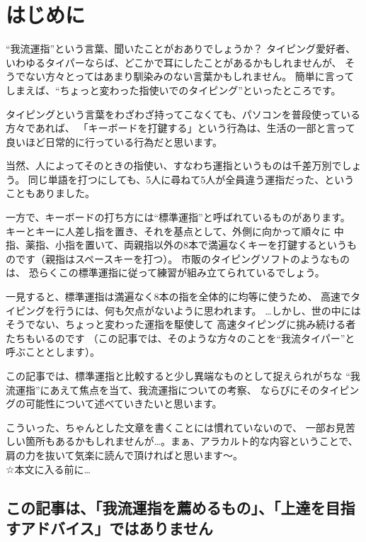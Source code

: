 
\section{はじめに}

“我流運指”という言葉、聞いたことがおありでしょうか？
タイピング愛好者、いわゆるタイパーならば、どこかで耳にしたことがあるかもしれませんが、
そうでない方々とってはあまり馴染みのない言葉かもしれません。
簡単に言ってしまえば、“ちょっと変わった指使いでのタイピング”といったところです。

タイピングという言葉をわざわざ持ってこなくても、パソコンを普段使っている方々であれば、
「キーボードを打鍵する」という行為は、生活の一部と言って良いほど日常的に行っている行為だと思います。

当然、人によってそのときの指使い、すなわち運指というものは千差万別でしょう。
同じ単語を打つにしても、5人に尋ねて5人が全員違う運指だった、ということもありました。

一方で、キーボードの打ち方には“標準運指”と呼ばれているものがあります。
キーとキーに人差し指を置き、それを基点として、外側に向かって順々に
中指、薬指、小指を置いて、両親指以外の8本で満遍なくキーを打鍵するというものです（親指はスペースキーを打つ）。
市販のタイピングソフトのようなものは、
恐らくこの標準運指に従って練習が組み立てられているでしょう。

一見すると、標準運指は満遍なく8本の指を全体的に均等に使うため、
高速でタイピングを行うには、何も欠点がないように思われます。
…しかし、世の中にはそうでない、ちょっと変わった運指を駆使して
高速タイピングに挑み続ける者たちもいるのです
（この記事では、そのような方々のことを“我流タイパー”と呼ぶこととします）。

この記事では、標準運指と比較すると少し異端なものとして捉えられがちな
“我流運指”にあえて焦点を当て、我流運指についての考察、
ならびにそのタイピングの可能性について述べていきたいと思います。

こういった、ちゃんとした文章を書くことには慣れていないので、
一部お見苦しい箇所もあるかもしれませんが…。まぁ、アラカルト的な内容ということで、
肩の力を抜いて気楽に読んで頂ければと思います～。\\

☆本文に入る前に…\\

\subsection*{この記事は、「我流運指を薦めるもの」、「上達を目指すアドバイス」ではありません}

